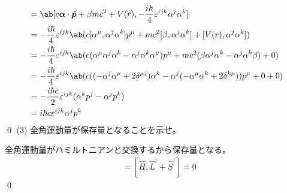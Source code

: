 \documentclass[uplatex,dvipdfmx,a4paper,11pt]{jlreq}
\makeatletter
\theoremstyle{definition}
\renewenvironment{proof}[1][\proofname]{\par
  \normalfont
  \topsep6\p@\@plus6\p@ \trivlist
  \item[\hskip\labelsep{\bfseries #1}\@addpunct{\bfseries}]\ignorespaces\quad\par
}{%
  \qed\endtrivlist\@endpefalse
}
\renewcommand\proofname{証明}
\newcommand{\pp}{\bm{p}}
\numberwithin{equation}{section}
\makeatother
\begin{document}
\begin{proof}
  \begin{align}
    [\hat{H}, \hat{S}^i] & = \ab[c\bm{\alpha}\cdot\hat{\pp} + \beta mc^2 + V(r), -\frac{i\hbar}{4}\varepsilon^{ijk}\alpha^j\alpha^k]                                                          \\
                         & = -\frac{i\hbar}{4}\varepsilon^{ijk}\ab(c[\alpha^\mu, \alpha^j\alpha^k]p^\mu + mc^2[\beta, \alpha^j\alpha^k] + [V(r), \alpha^j\alpha^k])                           \\
                         & = -\frac{i\hbar}{4}\varepsilon^{ijk}\ab(c(\alpha^\mu\alpha^j\alpha^k - \alpha^j\alpha^k\alpha^\mu)p^\mu + mc^2(\beta\alpha^j\alpha^k - \alpha^j\alpha^k\beta) + 0) \\
                         & = -\frac{i\hbar}{4}\varepsilon^{ijk}\ab(c((-\alpha^j\alpha^\mu + 2\delta^{\mu j})\alpha^k - \alpha^j(-\alpha^\mu\alpha^k + 2\delta^{k\mu}))p^\mu + 0 + 0)          \\
                         & = -\frac{i\hbar c}{2}\varepsilon^{ijk}(\alpha^kp^j - \alpha^jp^k)                                                                                                  \\
                         & = i\hbar c\varepsilon^{ijk}\alpha^jp^k
  \end{align}
\end{proof}
(3) 全角運動量が保存量となることを示せ。
\begin{proof}
  全角運動量がハミルトニアンと交換するから保存量となる。
  \begin{align}
    [\hat{H}, \hat{J}^i] & = [\hat{H}, \hat{L}^i + \hat{S}^i] = 0
  \end{align}
\end{proof}
\end{document}
